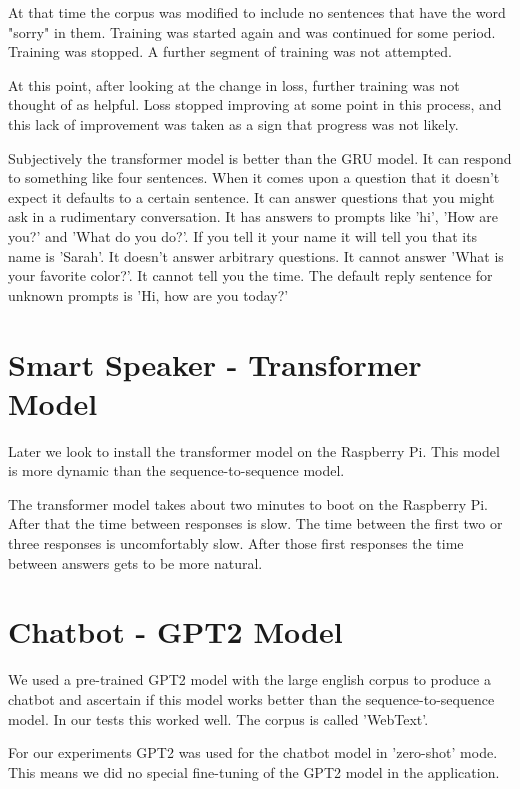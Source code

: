 At that time the corpus was modified to include no sentences that have the word "sorry" in them.
Training was started again and was continued for some period. Training was stopped. A further segment of training was not attempted. 

At this point, after looking at the change in loss, further training was not
thought of as helpful. Loss stopped improving at some point in this process, and this lack of
improvement was taken as a sign that progress was not likely.

Subjectively the transformer model is better than the GRU model. It can respond to something like
four sentences. When it comes upon a question that it doesn't expect it defaults to a certain sentence. It can answer questions that you might ask in a rudimentary conversation. It has answers to prompts like 'hi', 'How are you?' and 'What do you do?'. If you tell it your name it will tell you that its name is 'Sarah'. It doesn't answer arbitrary questions. It cannot answer 'What is your favorite color?'. It cannot tell you the time. The default reply sentence for unknown prompts is 'Hi, how are you today?'

\section{Smart Speaker - Transformer Model}

Later we look to install the transformer model on the Raspberry Pi. This model is more dynamic than the sequence-to-sequence model. 

The transformer model takes about two minutes to boot on the Raspberry Pi. After that the time between responses is slow. The time between the first two or three responses is uncomfortably slow. After those first responses the time between answers gets to be more natural.



\section{Chatbot - GPT2 Model}
We used a pre-trained GPT2 model with the large english corpus to produce a chatbot and ascertain if this model works better than the sequence-to-sequence model. In our tests this worked well. The corpus is called 'WebText'.

For our experiments GPT2 was used for the chatbot model in 'zero-shot' mode. This means we did no
special fine-tuning of the GPT2 model in the application.

